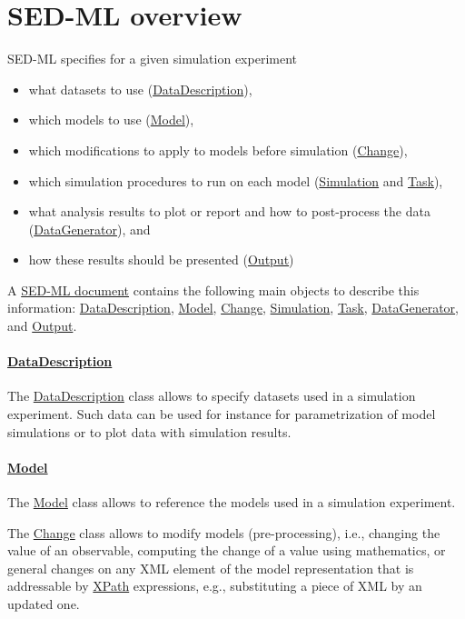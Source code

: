 \section{SED-ML overview}
SED-ML specifies for a given simulation experiment

\begin{itemize}
\item what datasets to use (\hyperref[class:dataDescription]{DataDescription}),
\item which models to use (\hyperref[class:model]{Model}),
\item which modifications to apply to models before simulation (\hyperref[class:change]{Change}),
\item which simulation procedures to run on each model (\hyperref[class:simulation]{Simulation} and \hyperref[class:task]{Task}),
\item what analysis results to plot or report and how to post-process the data (\hyperref[class:dataGenerator]{DataGenerator}), and
\item how these results should be presented (\hyperref[class:output]{Output})
\end{itemize}

A \hyperref[class:sed-ml]{SED-ML document} contains the following main objects to describe this information: \hyperref[class:dataDescription]{DataDescription}, \hyperref[class:model]{Model}, \hyperref[class:change]{Change}, \hyperref[class:simulation]{Simulation}, \hyperref[class:task]{Task}, \hyperref[class:dataGenerator]{DataGenerator}, and \hyperref[class:output]{Output}.

\paragraph*{\hyperref[class:dataDescription]{DataDescription}}
The \hyperref[class:dataDescription]{DataDescription} class allows to specify datasets used in a simulation experiment. Such data can be used for instance for parametrization of model simulations or to plot data with simulation results.

\paragraph*{\hyperref[class:model]{Model}}
The \hyperref[class:model]{Model} class allows to reference the models used in a simulation experiment.

The \hyperref[class:change]{Change} class allows to modify models (pre-processing), i.e., changing the value of an observable, computing the change of a value using mathematics, or general changes on any XML element of the model representation that is addressable by \hyperref[sec:xpath]{XPath} expressions, e.g., substituting a piece of XML by an updated one.

